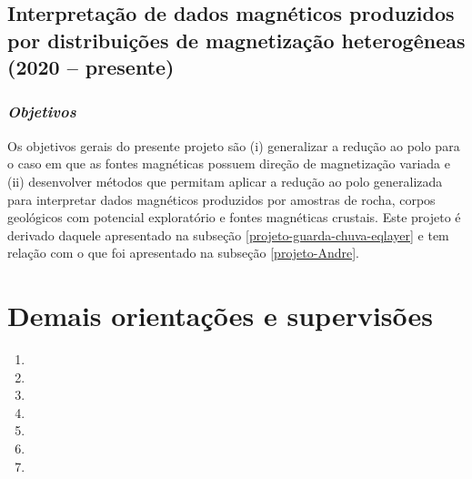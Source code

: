 \subsection{Interpretação de dados magnéticos produzidos por distribuições de magnetização heterogêneas (2020 -- presente)} \label{projeto-mag-heterogenea}

\subsubsection{\emph{Objetivos}}

Os objetivos gerais do presente projeto são (i) generalizar a redução ao 
polo para o caso em que as fontes magnéticas possuem direção de magnetização variada 
e (ii) desenvolver métodos que permitam aplicar a redução ao polo generalizada para 
interpretar dados magnéticos produzidos por amostras de rocha, corpos geológicos com 
potencial exploratório e fontes magnéticas crustais.
Este projeto é derivado daquele apresentado na subseção 
\ref{projeto-guarda-chuva-eqlayer} e tem relação com o que foi apresentado na subseção 
\ref{projeto-Andre}.


\section{Demais orientações e supervisões}

\begin{enumerate}
	
	\item{}
	\item{}
	\item{}
	\item{}
	\item{}
	\item{}
	\item{}

\end{enumerate}

